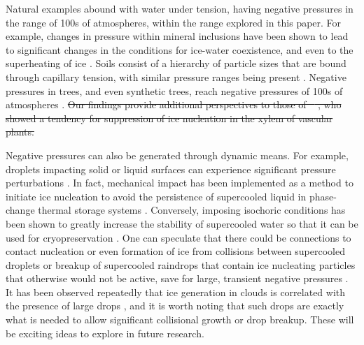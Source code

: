 \documentclass[journal abbreviation, manuscript]{copernicus}
\providecommand{\DIFdel}[1]{{\protect\color{red}\sout{#1}}}                      %
\providecommand{\DIFdelbegin}{} %
\providecommand{\DIFdelend}{} %
\begin{document}
Natural examples abound with water under tension, having negative pressures in the range of 100s of atmospheres, within the range explored in this paper. For example, changes in pressure within mineral inclusions have been shown to lead to significant changes in the conditions for ice-water coexistence, and even to the superheating of ice \citep{roedder1967metastable}. Soils consist of a hierarchy of particle sizes that are bound through capillary tension, with similar pressure ranges being present \citep{seiphoori2020}. Negative pressures in trees, and even synthetic trees, reach negative pressures of 100s of atmospheres \citep{wheeler2008transpiration}. \DIFdelbegin \DIFdel{Our findings provide additional perspectives to those of \mbox{%
\citet{lintunen2013anatomical}}\hspace{0pt}%
, who showed a tendency for suppression of ice nucleation in the xylem of vascular plants. 
}%

\DIFdelend Negative pressures can also be generated through dynamic means. For example, droplets impacting solid or liquid surfaces can experience significant pressure perturbations \citep{cheng2022drop}. In fact, mechanical impact has been implemented as a method to initiate ice nucleation to avoid the persistence of supercooled liquid in phase-change thermal storage systems \citep{wang2022nucleation}. Conversely, imposing isochoric conditions has been shown to greatly increase the stability of supercooled water so that it can be used for cryopreservation \citep{powell2020isochoric}. One can speculate that there could be connections to contact nucleation or even formation of ice from collisions between supercooled droplets \citep{alkezweeny1969freezing} or breakup of supercooled raindrops that contain ice nucleating particles that otherwise would not be active, save for large, transient negative pressures \citep{james2021impact}. It has been observed repeatedly that ice generation in clouds is correlated with the presence of large drops \citep{rangno1991ice,lance2011cloud}, and it is worth noting that such drops are exactly what is needed to allow significant collisional growth or drop breakup. These will be exciting ideas to explore in future research.
\end{document}
